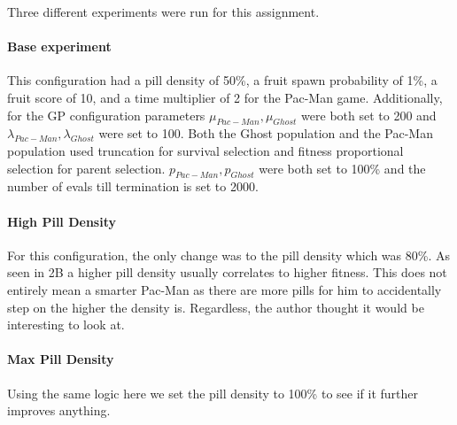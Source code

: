 Three different experiments were run for this assignment. 

\paragraph{Base experiment} This configuration had a pill density of 50\%, a fruit spawn probability of 1\%, a fruit score of 10, and a time multiplier of 2 for the Pac-Man game.
Additionally, for the GP configuration parameters $\mu_{Pac-Man},\mu_{Ghost}$ were both set to 200 and $\lambda_{Pac-Man}, \lambda_{Ghost}$ were set to 100. Both the Ghost population and the Pac-Man population used truncation for survival selection and fitness proportional selection for parent selection. $p_{Pac-Man},p_{Ghost}$ were both set to 100\% and the number of evals till termination is set to 2000.

\paragraph{High Pill Density}
For this configuration, the only change was to the pill density which was 80\%.
As seen in 2B a higher pill density usually correlates to higher fitness.
This does not entirely mean a smarter Pac-Man as there are more pills for him to accidentally step on the higher the density is.
Regardless, the author thought it would be interesting to look at.

\paragraph{Max Pill Density}

Using the same logic here we set the pill density to 100\% to see if it further improves anything.